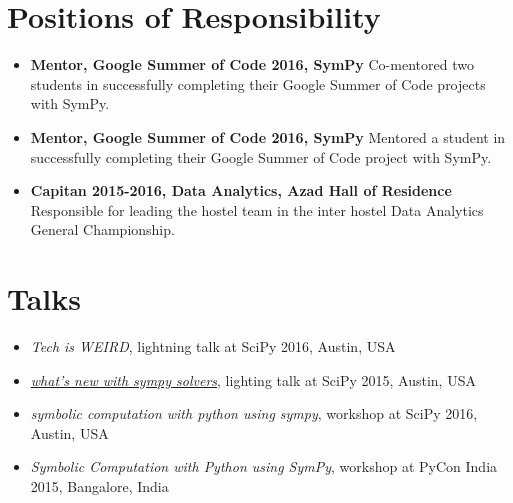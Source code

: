 \documentclass[a4paper,10pt]{article}
\begin{document}
\section{Positions of Responsibility}
\begin{itemize}

    \item \textbf{Mentor, Google Summer of Code 2016, SymPy}
    Co-mentored two students in successfully completing their Google Summer of
    Code projects with SymPy.

    \item \textbf{Mentor, Google Summer of Code 2016, SymPy}
    Mentored a student in successfully completing their Google Summer of
    Code project with SymPy.

    \item \textbf{Capitan 2015-2016, Data Analytics, Azad Hall of Residence}
    Responsible for leading the hostel team in the inter hostel
    Data Analytics General Championship.

\end{itemize}

\section{Talks}
\begin{itemize}
    \item \emph{Tech is WEIRD}, lightning talk at SciPy 2016, Austin, USA
    \item \emph{\href{https://www.youtube.com/watch?v=YCxQI4C34j8}{what's new with
        sympy solvers}}, lighting talk at SciPy 2015, Austin, USA
    \item \emph{symbolic computation with python using sympy}, workshop at
        SciPy 2016, Austin, USA
    \item \emph{Symbolic Computation with Python using SymPy}, workshop at PyCon India
        2015, Bangalore, India
\end{itemize}

\end{document}
